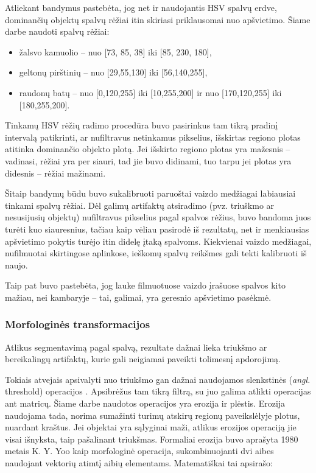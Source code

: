 \documentclass{VUMIFPSbakalaurinis}
\begin{document}
Atliekant bandymus pastebėta, jog net ir naudojantis HSV spalvų erdve, dominančių objektų spalvų rėžiai itin skiriasi priklausomai nuo apšvietimo. Šiame darbe naudoti spalvų rėžiai:

\begin{itemize} 
	\item žalsvo kamuolio – nuo [73, 85, 38] iki [85, 230, 180],
	\item geltonų pirštinių – nuo [29,55,130] iki [56,140,255],
	\item raudonų batų – nuo [0,120,255] iki [10,255,200] ir nuo [170,120,255] iki [180,255,200].
\end{itemize}

Tinkamų HSV rėžių radimo procedūra buvo pasirinkus tam tikrą pradinį intervalą patikrinti, ar nufiltravus netinkamus pikselius, išskirtas regiono plotas atitinka dominančio objekto plotą. Jei išskirto regiono plotas yra mažesnis – vadinasi, rėžiai yra per siauri, tad jie buvo didinami, tuo tarpu jei plotas yra didesnis – rėžiai mažinami. 

Šitaip bandymų būdu buvo sukalibruoti paruoštai vaizdo medžiagai labiausiai tinkami spalvų rėžiai. Dėl galimų artifaktų atsiradimo (pvz. triuškmo ar nesusijusių objektų) nufiltravus pikselius pagal spalvos rėžius, buvo bandoma juos turėti kuo siauresnius, tačiau kaip vėliau pasirodė iš rezultatų, net ir menkiausias apšvietimo pokytis turėjo itin didelę įtaką spalvoms. Kiekvienai vaizdo medžiagai, nufilmuotai skirtingose aplinkose, ieškomų spalvų reikšmes gali tekti kalibruoti iš naujo.

Taip pat buvo pastebėta, jog lauke filmuotuose vaizdo įrašuose spalvos kito mažiau, nei kambaryje – tai, galimai, yra geresnio apšvietimo pasėkmė. 

\subsubsection{Morfologinės transformacijos}
Atlikus segmentavimą pagal spalvą, rezultate dažnai lieka triukšmo ar bereikalingų artifaktų, kurie gali neigiamai paveikti tolimesnį apdorojimą.

Tokiais atvejais apsivalyti nuo triukšmo gan dažnai naudojamos slenkstinės (\textit{angl.} threshold) operacijos \cite[112]{SzeliskiCompVision}. Apsibrėžus tam tikrą filtrą, su juo galima atlikti operacijas ant matricų. Šiame darbe naudotos operacijos yra erozija ir plėstis. Erozija naudojama tada, norima sumažinti turimų atskirų regionų paveikslėlyje plotus, nuardant kraštus. Jei objektai yra sąlyginai maži, atlikus erozijos operaciją jie visai išnyksta, taip pašalinant triukšmas. Formaliai erozija buvo aprašyta 1980 metais K. Y. Yoo \cite{4767941} kaip morfologinė operacija, sukombinuojanti dvi aibes naudojant vektorių atimtį aibių elementams. Matematiškai tai apsirašo: 
\end{document}
